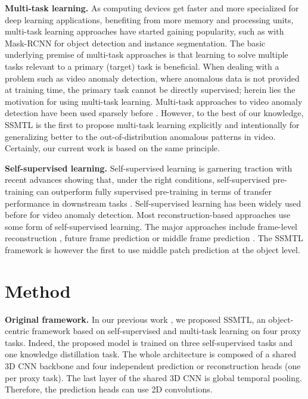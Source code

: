 \documentclass[times,twocolumn,final,authoryear]{elsarticle}
\begin{document}
\noindent
\textbf{Multi-task learning.}
As computing devices get faster and more specialized for deep learning applications, benefiting from more memory and processing units, multi-task learning approaches have started gaining popularity, such as with Mask-RCNN \citep{He-ICCV-2017} for object detection and instance segmentation. The basic underlying premise of multi-task approaches is that learning to solve multiple tasks relevant to a primary (target) task is beneficial. When dealing with a problem such as video anomaly detection, where anomalous data is not provided at training time, the primary task cannot be directly supervised; herein lies the motivation for using multi-task learning. Multi-task approaches to video anomaly detection have been used sparsely before \citep{Park-CVPR-2020,Tang-PRL-2020}. However, to the best of our knowledge, SSMTL is the first to propose multi-task learning explicitly and intentionally for generalizing better to the out-of-distribution anomalous patterns in video. Certainly, our current work is based on the same principle.

\noindent
\textbf{Self-supervised learning.}
Self-supervised learning is garnering traction with recent advances showing that, under the right conditions, self-supervised pre-training can outperform fully supervised pre-training in terms of transfer performance in downstream tasks \citep{He-CVPR-2022,He-CVPR-2020}. Self-supervised learning has been widely used before for video anomaly detection. Most reconstruction-based approaches use some form of self-supervised learning. The major approaches include frame-level reconstruction \citep{Hasan-CVPR-2016}, future frame prediction \citep{Dong-Access-2020,Liu-CVPR-2019} or middle frame prediction \citep{Lee-TIP-2019}. The SSMTL framework is however the first to use middle patch prediction at the object level.



\section{Method}
\label{sec_method}


\noindent
\textbf{Original framework.}
In our previous work \citep{Georgescu-CVPR-2021}, we proposed SSMTL, an object-centric framework based on self-supervised and multi-task learning on four proxy tasks. Indeed, the proposed model is trained on three self-supervised tasks and one knowledge distillation task.
The whole architecture is composed of a shared 3D CNN backbone and four independent prediction or reconstruction heads (one per proxy task). The last layer of the shared 3D CNN is global temporal pooling. Therefore, the prediction heads can use 2D convolutions.
\end{document}
